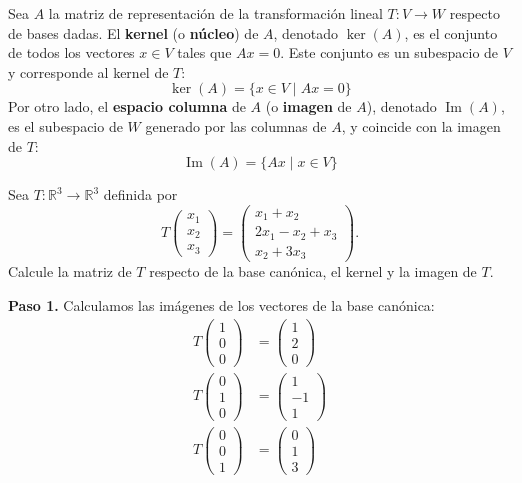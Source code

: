 



\begin{definition}
Sea $A$ la matriz de representación de la transformación lineal $T: V \to W$ respecto de bases dadas. El \textbf{kernel} (o \textbf{núcleo}) de $A$, denotado $\ker(A)$, es el conjunto de todos los vectores $x \in V$ tales que $Ax = 0$. Este conjunto es un subespacio de $V$ y corresponde al kernel de $T$:
\[
\ker(A) = \{ x \in V \mid Ax = 0 \}
\]
Por otro lado, el \textbf{espacio columna} de $A$ (o \textbf{imagen} de $A$), denotado $\operatorname{Im}(A)$, es el subespacio de $W$ generado por las columnas de $A$, y coincide con la imagen de $T$:
\[
\operatorname{Im}(A) = \{ Ax \mid x \in V \}
\]
\end{definition}

\begin{example}
Sea $T: \mathbb{R}^3 \to \mathbb{R}^3$ definida por
\[
T\begin{pmatrix} x_1 \\ x_2 \\ x_3 \end{pmatrix} = \begin{pmatrix} x_1 + x_2 \\ 2x_1 - x_2 + x_3 \\ x_2 + 3x_3 \end{pmatrix}.
\]
Calcule la matriz de $T$ respecto de la base canónica, el kernel y la imagen de $T$.
\begin{myproof}
\textbf{Paso 1.} Calculamos las imágenes de los vectores de la base canónica:
\begin{align*}
T\begin{pmatrix} 1 \\ 0 \\ 0 \end{pmatrix} &= \begin{pmatrix} 1 \\ 2 \\ 0 \end{pmatrix} \\
T\begin{pmatrix} 0 \\ 1 \\ 0 \end{pmatrix} &= \begin{pmatrix} 1 \\ -1 \\ 1 \end{pmatrix} \\
T\begin{pmatrix} 0 \\ 0 \\ 1 \end{pmatrix} &= \begin{pmatrix} 0 \\ 1 \\ 3 \end{pmatrix}
\end{align*}


\end{myproof}
\end{example}
